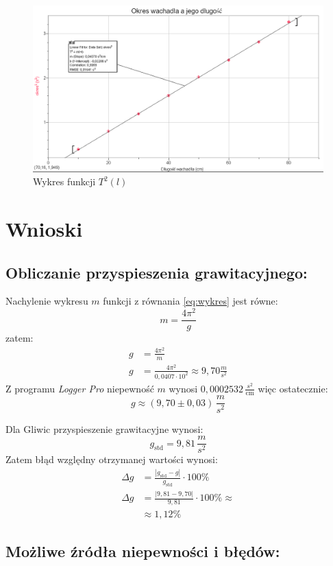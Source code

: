 \documentclass[a4paper,12pt]{article}
\begin{document}
\begin{figure}
		\centering
		\includegraphics[width = \linewidth]{wykres}
		\caption{Wykres funkcji $T^2 \left( l \right)$}
		\label{fig:wykres}
\end{figure}
\section{Wnioski}
\subsection*{Obliczanie przyspieszenia grawitacyjnego:}

Nachylenie wykresu $m$ funkcji z równania \ref{eq:wykres} jest równe:
\[m = \frac{4\pi^2}{g} \]
zatem:
\begin{align*}
		g &= \frac{4\pi^2}{m}\\
		g &= \frac{4\pi^2}{0,0407 \cdot 10^2} \approx 9,70 \frac{m}{s^2}
\end{align*}
Z programu \emph{Logger Pro} niepewność $m$ wynosi $0,0002532 \, \frac{s^2}{\text{cm}}$ więc ostatecznie:
\[ g \approx \left( 9,70 \pm 0,03 \right) \, \frac{m}{s^2} \]

Dla Gliwic przyspieszenie grawitacyjne wynosi:
\[ g_{\text{std}} = 9,81 \, \frac{m}{s^2}\]
Zatem błąd względny otrzymanej wartości wynosi:
\begin{align*}
		\Delta g &= \frac{\left|g_{\text{std}} - g\right|}{g_{\text{std}}} \cdot 100 \text{\%} \\
		\Delta g &= \frac{| 9,81 - 9,70|}{9,81} \cdot 100 \text{\%} \approx\\
		&\approx 1,12 \text{\%}
\end{align*}

\subsection*{Możliwe źródła niepewności i błędów:}
\end{document}
